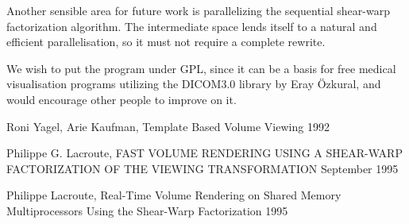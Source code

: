 \documentclass[a4paper,12pt]{article}
\begin{document}
Another sensible area for future work is parallelizing the
sequential shear-warp factorization algorithm. The intermediate space
lends itself to a natural and efficient parallelisation, so it must
not require a complete rewrite.

We wish to put the program under GPL, since it can be a basis for free
medical visualisation programs utilizing the DICOM3.0 library by Eray
\"Ozkural, and would encourage other people to improve on it.


\newpage

\begin{thebibliography}{20}
  
 Roni Yagel, Arie Kaufman, Template Based Volume
  Viewing 1992
  
 Philippe G. Lacroute, FAST VOLUME RENDERING USING A
  SHEAR-WARP FACTORIZATION OF THE VIEWING TRANSFORMATION September
  1995
  
 Philippe Lacroute, Real-Time Volume Rendering on Shared
  Memory Multiprocessors Using the Shear-Warp Factorization 1995


\end{thebibliography} 
\end{document}

